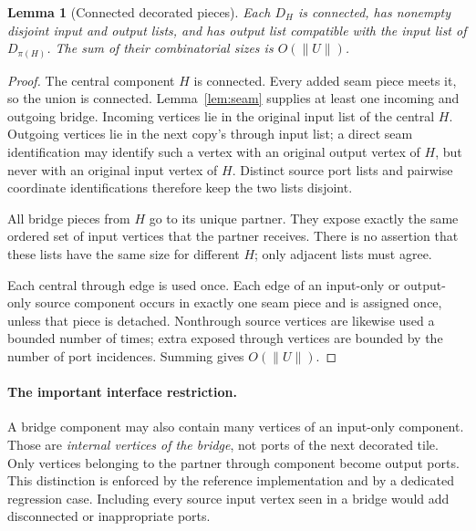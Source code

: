 \documentclass[11pt]{article}
\newtheorem{lemma}[theorem]{Lemma}
\theoremstyle{remark}\newtheorem{remark}[theorem]{Remark}
\newcommand{\size}[1]{\lVert #1\rVert}
\begin{document}
\begin{lemma}[Connected decorated pieces]\label{lem:decorated}
Each $D_H$ is connected, has nonempty disjoint input and output lists, and has output list compatible with the input list of $D_{\pi(H)}$. The sum of their combinatorial sizes is $O(\size{U})$.
\end{lemma}
\begin{proof}
The central component $H$ is connected. Every added seam piece meets it, so the union is connected. Lemma~\ref{lem:seam} supplies at least one incoming and outgoing bridge. Incoming vertices lie in the original input list of the central $H$. Outgoing vertices lie in the next copy's through input list; a direct seam identification may identify such a vertex with an original output vertex of $H$, but never with an original input vertex of $H$. Distinct source port lists and pairwise coordinate identifications therefore keep the two lists disjoint.

All bridge pieces from $H$ go to its unique partner. They expose exactly the same ordered set of input vertices that the partner receives. There is no assertion that these lists have the same size for different $H$; only adjacent lists must agree.

Each central through edge is used once. Each edge of an input-only or output-only source component occurs in exactly one seam piece and is assigned once, unless that piece is detached. Nonthrough source vertices are likewise used a bounded number of times; extra exposed through vertices are bounded by the number of port incidences. Summing gives $O(\size{U})$.
\end{proof}

\paragraph{The important interface restriction.}
A bridge component may also contain many vertices of an input-only component. Those are \emph{internal vertices of the bridge}, not ports of the next decorated tile. Only vertices belonging to the partner through component become output ports. This distinction is enforced by the reference implementation and by a dedicated regression case. Including every source input vertex seen in a bridge would add disconnected or inappropriate ports.
\end{document}
